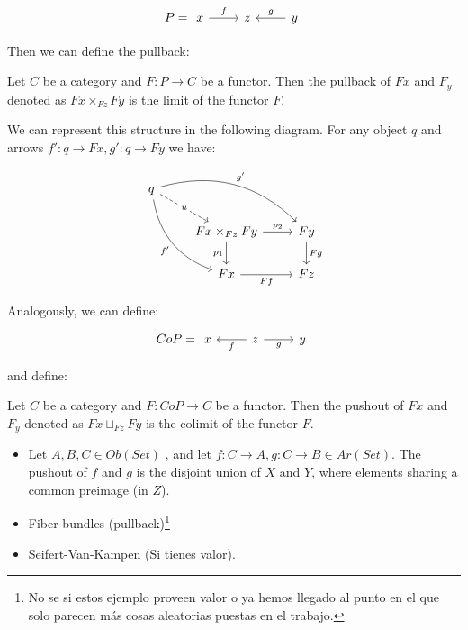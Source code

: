 \[
  P = \begin{tikzcd}
    x\arrow{r}{f} & z & y\arrow[swap]{l}{g}
\end{tikzcd}
\]

Then we can define the pullback:

\begin{definition}
  Let $C$ be a category and $F:P\to C$ be a functor. Then the pullback of $Fx$ and $F_y$ denoted as $Fx\times_{Fz}Fy$ is the limit of the functor $F$.
\end{definition}

We can represent this structure in the following diagram. For any object $q$ and arrows $f':q\to Fx,g':q\to Fy$ we have:

\[
\begin{tikzcd}
q
\arrow[bend left]{drr}{g'}
\arrow[bend right,swap]{ddr}{f'}
\arrow[dashed]{dr}[description]{u} & & \\
& Fx\times_{Fz}Fy \arrow{r}{p_2} \arrow{d}[swap]{p_1}
& Fy \arrow{d}{Fg} \\
& Fx \arrow[swap]{r}{Ff}
& Fz
\end{tikzcd}
\]

Analogously, we can define:

\[
  CoP = \begin{tikzcd}
    x & z\arrow{l}{f}\arrow[swap]{r}{g} & y
\end{tikzcd}
\]

and define:
\begin{definition}
  Let $C$ be a category and $F:CoP\to C$ be a functor. Then the pushout of $Fx$ and $F_y$ denoted as $Fx\sqcup_{Fz}Fy$ is the colimit of the functor $F$.
\end{definition}

\begin{example}
  \begin{itemize}
  \item Let $A,B,C\in Ob(Set)$ , and let  $f : C \to A, g : C \to B\in Ar(Set)$. The pushout of $f$ and $g$ is the disjoint union of $X$ and $Y$, where elements sharing a common preimage (in $Z$).

  \item Fiber bundles (pullback)\footnote{No se si estos ejemplo proveen valor o ya hemos llegado al punto en el que solo parecen más cosas aleatorias puestas en el trabajo.}

   \item Seifert-Van-Kampen (Si tienes valor).
  \end{itemize}
\end{example}

